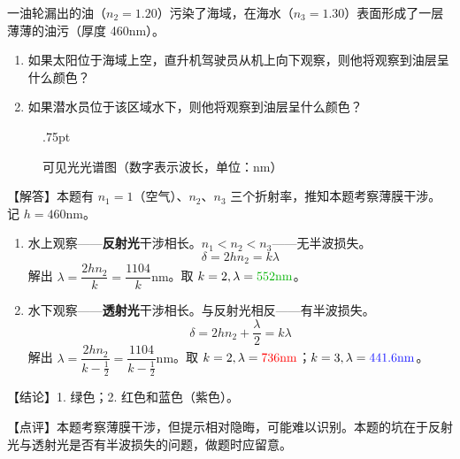 \documentclass[UTF8]{ctexart}
\begin{document}
{\color{cyan!50!black}

一油轮漏出的油（$n_2=1.20$）污染了海域，在海水（$n_3=1.30$）表面形成了一层薄薄的油污（厚度 460nm）。
\begin{enumerate}[itemsep=0pt,parsep=0pt]
  \item 如果太阳位于海域上空，直升机驾驶员从机上向下观察，则他将观察到油层呈什么颜色？
  \item 如果潜水员位于该区域水下，则他将观察到油层呈什么颜色？
\end{enumerate}
}

\begin{figure}[htb]
    \centering
    \newcount\WL \unitlength.75pt

    \caption{可见光光谱图（数字表示波长，单位：nm）}\label{fig:guangpu}
\end{figure}

【解答】本题有 $n_1=1$（空气）、$n_2$、$n_3$ 三个折射率，推知本题考察薄膜干涉。记 $h=460\mathrm{nm}$。

\begin{enumerate}
    \item 水上观察——\textbf{反射光}干涉相长。$n_1<n_2<n_3$——无半波损失。
        \begin{equation}\label{eq:1}
            \delta = 2hn_2 = k\lambda
        \end{equation}
        解出 $\lambda = \dfrac{2hn_2}{k} = \dfrac{1104}{k}\mathrm{nm}$。取 $k=2,\lambda=\textcolor{green!70!black}{552\mathrm{nm}}$。
    \item 水下观察——\textbf{透射光}干涉相长。与反射光相反——有半波损失。
        \begin{equation}\label{eq:2}
            \delta = 2hn_2 + \dfrac{\lambda}2 =  k\lambda
        \end{equation}
        解出 $\lambda = \dfrac{2hn_2}{k-\frac12} = \dfrac{1104}{k-\frac12}\mathrm{nm}$。取 $k=2,\lambda=\textcolor{red}{736\mathrm{nm}}$；$k=3,\lambda=\textcolor{blue!90!white}{441.6\mathrm{nm}}$。
\end{enumerate}

\textcolor{cyan!80!black}{【结论】1. 绿色；2. 红色和蓝色（紫色）。}

\textcolor{cyan!80!black}{【点评】本题考察薄膜干涉，但提示相对隐晦，可能难以识别。本题的坑在于反射光与透射光是否有半波损失的问题，做题时应留意。}
\end{document}
